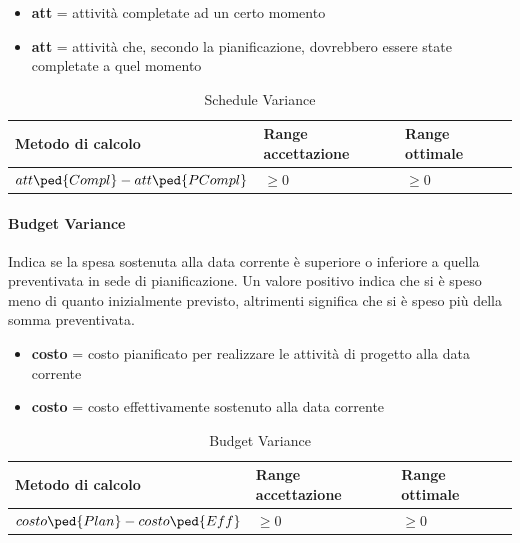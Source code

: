 				\begin{itemize}
				\item \textbf{att} = attività completate ad un certo momento
				\item \textbf{att} = attività che, secondo la pianificazione, dovrebbero essere state completate a quel momento
			\end{itemize}
			
			\begin{table}[H]
				\begin{longtable}{>{\centering\arraybackslash}p{5cm}|>{\centering\arraybackslash}p{5cm} | >{\centering\arraybackslash}p{5cm}}
					\hline
					\rowcolor{Gray}
					\textbf{Metodo di calcolo} & \textbf{Range accettazione} & \textbf{Range ottimale} \\
					\hline
					\begin{math}
					{att\ped{Compl} - att\ped{PCompl}}
					\end{math}  &  \begin{math}\geq{0} \end{math}  &  \begin{math}\geq{0} \end{math} 
				\end{longtable}
				\caption{Schedule Variance}
			\end{table}
		
		\paragraph{Budget Variance}
		Indica se la spesa sostenuta alla data corrente è superiore o inferiore a quella preventivata in sede di pianificazione.
		Un valore positivo indica che si è speso meno di quanto inizialmente previsto, altrimenti significa che si è speso più della somma preventivata.
		
		\begin{itemize}
			\item \textbf{costo} = costo pianificato per realizzare le attività di progetto alla data corrente
			\item \textbf{costo} = costo effettivamente sostenuto alla data corrente
		\end{itemize}
		
		\begin{table}[H]
			\begin{longtable}{>{\centering\arraybackslash}p{5cm}|>{\centering\arraybackslash}p{5cm} | >{\centering\arraybackslash}p{5cm}}
				\hline
				\rowcolor{Gray}
				\textbf{Metodo di calcolo} & \textbf{Range accettazione} & \textbf{Range ottimale} \\
				\hline
				\begin{math}
				{costo\ped{Plan} - costo\ped{Eff}}
				\end{math} & \begin{math}\geq{0} \end{math}  & \begin{math}\geq{0} \end{math}
			\end{longtable}
			\caption{Budget Variance}
		\end{table}
		
